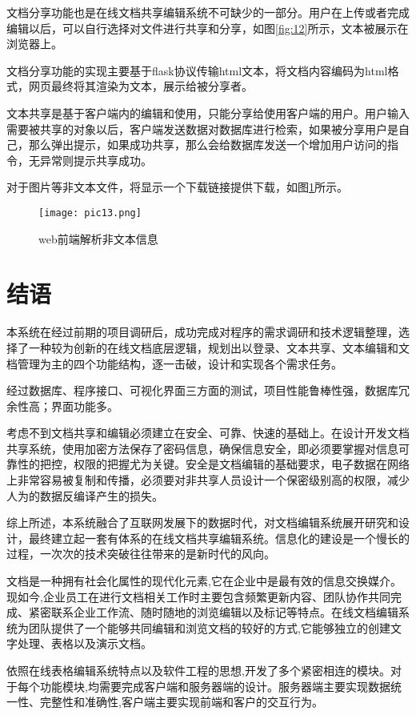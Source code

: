 \documentclass[forprint]{software}
\begin{document}
文档分享功能也是在线文档共享编辑系统不可缺少的一部分。用户在上传或者完成编辑以后，可以自行选择对文件进行共享和分享，如图\ref{fig:12}所示，文本被展示在浏览器上。

文档分享功能的实现主要基于flask协议传输html文本，将文档内容编码为html格式，网页最终将其渲染为文本，展示给被分享者。

文本共享是基于客户端内的编辑和使用，只能分享给使用客户端的用户。用户输入需要被共享的对象以后，客户端发送数据对数据库进行检索，如果被分享用户是自己，那么弹出提示，如果成功共享，那么会给数据库发送一个增加用户访问的指令，无异常则提示共享成功。

对于图片等非文本文件，将显示一个下载链接提供下载，如图\ref{fig:13}所示。

\begin{figure}[!htbp]
	\centering
	\texttt{[image: pic13.png]}
	\caption{web前端解析非文本信息}
	\label{fig:13}
\end{figure}

\chapter{结语}

本系统在经过前期的项目调研后，成功完成对程序的需求调研和技术逻辑整理，选择了一种较为创新的在线文档底层逻辑，规划出以登录、文本共享、文本编辑和文档管理为主的四个功能结构，逐一击破，设计和实现各个需求任务。

经过数据库、程序接口、可视化界面三方面的测试，项目性能鲁棒性强，数据库冗余性高；界面功能多。

考虑不到文档共享和编辑必须建立在安全、可靠、快速的基础上。在设计开发文档共享系统，使用加密方法保存了密码信息，确保信息安全，即必须要掌握对信息可靠性的把控，权限的把握尤为关键。安全是文档编辑的基础要求，电子数据在网络上非常容易被复制和传播，必须要对非共享人员设计一个保密级别高的权限，减少人为的数据反编译产生的损失。

综上所述，本系统融合了互联网发展下的数据时代，对文档编辑系统展开研究和设计，最终建立起一套有体系的在线文档共享编辑系统。信息化的建设是一个慢长的过程，一次次的技术突破往往带来的是新时代的风向。

文档是一种拥有社会化属性的现代化元素,它在企业中是最有效的信息交换媒介。现如今,企业员工在进行文档相关工作时主要包含频繁更新内容、团队协作共同完成、紧密联系企业工作流、随时随地的浏览编辑以及标记等特点。在线文档编辑系统为团队提供了一个能够共同编辑和浏览文档的较好的方式,它能够独立的创建文字处理、表格以及演示文档。

依照在线表格编辑系统特点以及软件工程的思想,开发了多个紧密相连的模块。对于每个功能模块,均需要完成客户端和服务器端的设计。服务器端主要实现数据统一性、完整性和准确性,客户端主要实现前端和客户的交互行为。
\end{document}
